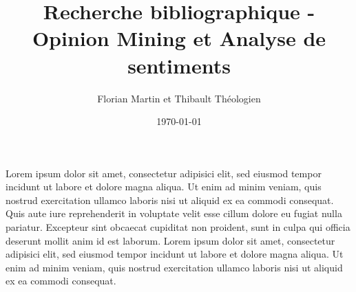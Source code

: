 \documentclass{article}
\title{Recherche bibliographique - Opinion Mining et Analyse de sentiments}
\author{Florian Martin et Thibault Théologien}
\date{\today}
\begin{document}
\begin{multicols}{2}
    Lorem ipsum dolor sit amet, consectetur adipisici elit, sed eiusmod tempor incidunt ut labore
    et dolore magna aliqua. Ut enim ad minim veniam, quis nostrud exercitation ullamco laboris nisi
    ut aliquid ex ea commodi consequat. Quis aute iure reprehenderit in voluptate velit esse cillum
    dolore eu fugiat nulla pariatur. Excepteur sint obcaecat cupiditat non proident, sunt in culpa qui
    officia deserunt mollit anim id est laborum.
    Lorem ipsum dolor sit amet, consectetur adipisici elit, sed eiusmod tempor incidunt ut labore
    et dolore magna aliqua. Ut enim ad minim veniam, quis nostrud exercitation ullamco laboris nisi
    ut aliquid ex ea commodi consequat.
\end{multicols}

\newpage


\nocite{*}
\end{document}
